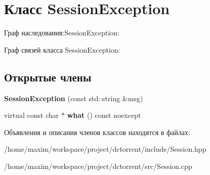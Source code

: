 \hypertarget{class_session_exception}{}\section{Класс Session\+Exception}
\label{class_session_exception}


Граф наследования\+:Session\+Exception\+:


Граф связей класса Session\+Exception\+:
\subsection*{Открытые члены}
\begin{DoxyCompactItemize}
\item 
\mbox{\label{class_session_exception_a9b5db8bd5748d69b5d533850118f9a4b}} 
{\bfseries Session\+Exception} (const std\+::string \&msg)
\item 
\mbox{\label{class_session_exception_a50439e6eb93e97cdc80da54fa00836a7}} 
virtual const char $\ast$ {\bfseries what} () const noexcept
\end{DoxyCompactItemize}


Объявления и описания членов классов находятся в файлах\+:\begin{DoxyCompactItemize}
\item 
/home/maxim/workspace/project/dctorrent/include/Session.\+hpp\item 
/home/maxim/workspace/project/dctorrent/src/Session.\+cpp\end{DoxyCompactItemize}
